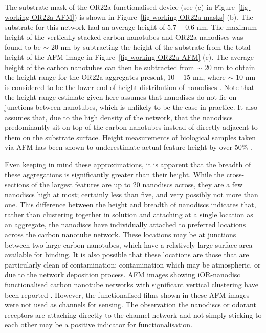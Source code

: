 \documentclass[
  a4paper,
]{scrbook}
\begin{document}
The substrate mask of the OR22a-functionalised device (see (c) in
Figure~\ref{fig-working-OR22a-AFM}) is shown in
Figure~\ref{fig-working-OR22a-masks} (b). The substrate for this network
had an average height of \(5.7 \pm 0.6\) nm. The maximum height of the
vertically-stacked carbon nanotubes and OR22a nanodiscs was found to be
\(\sim\) 20 nm by subtracting the height of the substrate from the total
height of the AFM image in Figure~\ref{fig-working-OR22a-AFM} (c). The
average height of the carbon nanotubes can then be subtracted from
\(\sim\) 20 nm to obtain the height range for the OR22a aggregates
present, \(10-15\) nm, where \(\sim\) 10 nm is considered to be the
lower end of height distribution of nanodiscs
\autocite{Nath2007,Bayburt2010,Murugathas2020}. Note that the height
range estimate given here assumes that nanodiscs do not lie on junctions
between nanotubes, which is unlikely to be the case in practice. It also
assumes that, due to the high density of the network, that the nanodiscs
predominantly sit on top of the carbon nanotubes instead of directly
adjacent to them on the substrate surface. Height measurements of
biological samples taken via AFM has been shown to underestimate actual
feature height by over 50\% \autocite{Vobornik2023}.

Even keeping in mind these approximations, it is apparent that the
breadth of these aggregations is significantly greater than their
height. While the cross-sections of the largest features are up to 20
nanodiscs across, they are a few nanodiscs high at most; certainly less
than five, and very possibly not more than one. This difference between
the height and breadth of nanodiscs indicates that, rather than
clustering together in solution and attaching at a single location as an
aggregate, the nanodiscs have individually attached to preferred
locations across the carbon nanotube network. These locations may be at
junctions between two large carbon nanotubes, which have a relatively
large surface area available for binding. It is also possible that these
locations are those that are particularly clean of contamination;
contamination which may be atmospheric, or due to the network deposition
process. AFM images showing iOR-nanodisc functionalised carbon nanotube
networks with significant vertical clustering have been reported
\autocite{Murugathas2019b}. However, the functionalised films shown in
these AFM images were not used as channels for sensing. The observation
the nanodiscs or odorant receptors are attaching directly to the channel
network and not simply sticking to each other may be a positive
indicator for functionalisation.
\end{document}
